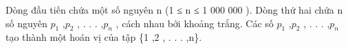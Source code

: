 Dòng đầu tiến chứa một số nguyên n (1 ≤ n ≤ 1 000 000 ). Dòng thứ hai chứa n số nguyên $p_{1}$   ,$p_{2}$   , . . . ,$p_{n}$   , cách nhau bởi khoảng trắng. Các số $p_{1}$   ,$p_{2}$   , . . . ,$p_{n}$   tạo thành một hoán vị của tập \{1 ,2 , . . . ,n\}.